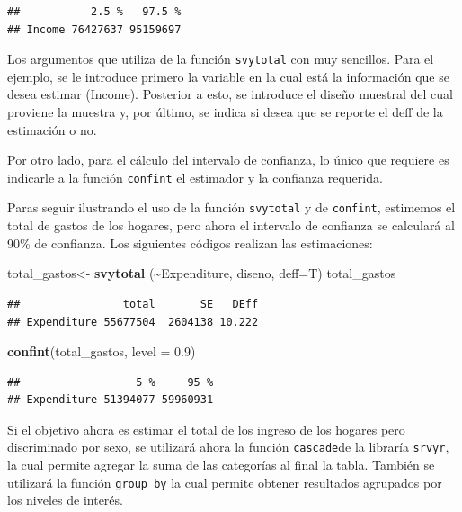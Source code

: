 \documentclass[
  spanish,
  12pt,
]{book}
\newenvironment{Shaded}{\begin{snugshade}}{\end{snugshade}}
\newcommand{\AttributeTok}[1]{\textcolor[rgb]{0.13,0.29,0.53}{#1}}
\newcommand{\FloatTok}[1]{\textcolor[rgb]{0.00,0.00,0.81}{#1}}
\newcommand{\FunctionTok}[1]{\textcolor[rgb]{0.13,0.29,0.53}{\textbf{#1}}}
\newcommand{\NormalTok}[1]{#1}
\newcommand{\OtherTok}[1]{\textcolor[rgb]{0.56,0.35,0.01}{#1}}
\newcommand{\SpecialCharTok}[1]{\textcolor[rgb]{0.81,0.36,0.00}{\textbf{#1}}}
\begin{document}
\begin{verbatim}
##           2.5 %   97.5 %
## Income 76427637 95159697
\end{verbatim}

Los argumentos que utiliza de la función \texttt{svytotal} con muy sencillos. Para el ejemplo, se le introduce primero la variable en la cual está la información que se desea estimar (Income). Posterior a esto, se introduce el diseño muestral del cual proviene la muestra y, por último, se indica si desea que se reporte el deff de la estimación o no.

Por otro lado, para el cálculo del intervalo de confianza, lo único que requiere es indicarle a la función \texttt{confint} el estimador y la confianza requerida.

Paras seguir ilustrando el uso de la función \texttt{svytotal} y de \texttt{confint}, estimemos el total de gastos de los hogares, pero ahora el intervalo de confianza se calculará al 90\% de confianza. Los siguientes códigos realizan las estimaciones:

\begin{Shaded}
\begin{Highlighting}[]
\NormalTok{total\_gastos}\OtherTok{\textless{}{-}} \FunctionTok{svytotal}\NormalTok{ (}\SpecialCharTok{\textasciitilde{}}\NormalTok{Expenditure, diseno, }\AttributeTok{deff=}\NormalTok{T)}
\NormalTok{total\_gastos}
\end{Highlighting}
\end{Shaded}

\begin{verbatim}
##                total       SE   DEff
## Expenditure 55677504  2604138 10.222
\end{verbatim}

\begin{Shaded}
\begin{Highlighting}[]
\FunctionTok{confint}\NormalTok{(total\_gastos, }\AttributeTok{level =} \FloatTok{0.9}\NormalTok{)}
\end{Highlighting}
\end{Shaded}

\begin{verbatim}
##                  5 %     95 %
## Expenditure 51394077 59960931
\end{verbatim}

Si el objetivo ahora es estimar el total de los ingreso de los hogares pero discriminado por sexo, se utilizará ahora la función \texttt{cascade}de la libraría \texttt{srvyr}, la cual permite agregar
la suma de las categorías al final la tabla. También se utilizará la función \texttt{group\_by} la cual permite obtener resultados agrupados por los niveles de interés.
\end{document}

